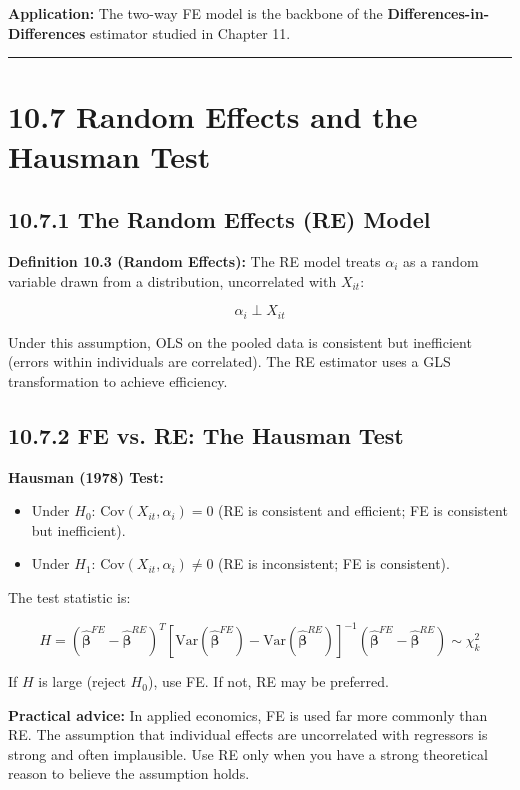 \textbf{Application:} The two-way FE model is the backbone of the \textbf{Differences-in-Differences} estimator studied in Chapter 11.

\medskip\hrule\medskip

\section{10.7 Random Effects and the Hausman Test}

\subsection{10.7.1 The Random Effects (RE) Model}

\textbf{Definition 10.3 (Random Effects):} The RE model treats $\alpha_i$ as a random variable drawn from a distribution, uncorrelated with $X_{it}$:

\[
\alpha_i \perp X_{it}
\]

Under this assumption, OLS on the pooled data is consistent but inefficient (errors within individuals are correlated). The RE estimator uses a GLS transformation to achieve efficiency.

\subsection{10.7.2 FE vs. RE: The Hausman Test}

\textbf{Hausman (1978) Test:}

\begin{itemize}
\item Under $H_0$: $\text{Cov}(X_{it}, \alpha_i) = 0$ (RE is consistent and efficient; FE is consistent but inefficient).
\item Under $H_1$: $\text{Cov}(X_{it}, \alpha_i) \neq 0$ (RE is inconsistent; FE is consistent).
\end{itemize}

The test statistic is:

\[
H = (\hat{\boldsymbol{\beta}}^{FE} - \hat{\boldsymbol{\beta}}^{RE})^T \left[\text{Var}(\hat{\boldsymbol{\beta}}^{FE}) - \text{Var}(\hat{\boldsymbol{\beta}}^{RE})\right]^{-1} (\hat{\boldsymbol{\beta}}^{FE} - \hat{\boldsymbol{\beta}}^{RE}) \sim \chi^2_k
\]

If $H$ is large (reject $H_0$), use FE. If not, RE may be preferred.

\textbf{Practical advice:} In applied economics, FE is used far more commonly than RE. The assumption that individual effects are uncorrelated with regressors is strong and often implausible. Use RE only when you have a strong theoretical reason to believe the assumption holds.

